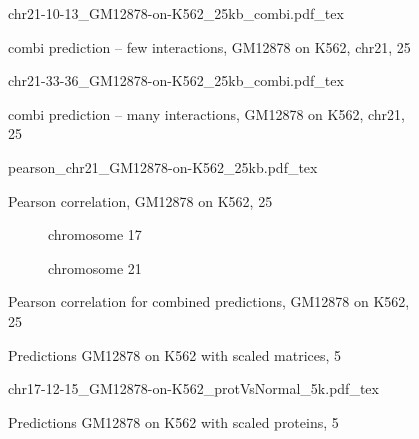 \begin{appendices}
\begin{figure}[hb]
 \centering
 \scriptsize
 {chr21-10-13_GM12878-on-K562_25kb_combi.pdf_tex}
 \caption{combi prediction -- few interactions, GM12878 on K562, chr21, \SI{25}{\kilo\bp}}
 \label{fig:app:GM12878:K562:chr21:25k:combiFew}
\end{figure}
\begin{figure}[hb]
 \centering
 \scriptsize
 {chr21-33-36_GM12878-on-K562_25kb_combi.pdf_tex}
 \caption{combi prediction -- many interactions, GM12878 on K562, chr21, \SI{25}{\kilo\bp}}
 \label{fig:app:GM12878:K562:chr21:25k:combiMany}
\end{figure}
\begin{figure}[hb]
 \centering
 \scriptsize
 {pearson_chr21_GM12878-on-K562_25kb.pdf_tex}
 \caption{Pearson correlation, GM12878 on K562, \SI{25}{\kilo\bp} }
 \label{fig:app:Pearson:GM12878:K562:chr21:25kb}
\end{figure}

\begin{figure}[hb]
 \centering
 \begin{subfigure}{0.495\textwidth}
 \centering
 \caption{chromosome 17}
 \label{fig:app:Pearson:GM12878:K562:chr17:25kb:combi}
\end{subfigure} \hfill
\begin{subfigure}{0.495\textwidth}
 \centering
 \caption{chromosome 21}
 \label{fig:app:Pearson:GM12878:K562:chr21:25kb:combi}
 \end{subfigure}
 \caption{Pearson correlation for combined predictions, GM12878 on K562, \SI{25}{\kilo\bp} }
\end{figure}

\begin{figure}[hb]
 \centering
 \caption{Predictions GM12878 on K562 with scaled matrices, \SI{5}{\kilo\bp}}
 \label{fig:app:GM12878:K562:chr17:normalizedMatrices}
\end{figure}
\begin{figure}[hb]
 \centering
 \scriptsize
 {chr17-12-15_GM12878-on-K562_protVsNormal_5k.pdf_tex}
 \caption{Predictions GM12878 on K562 with scaled proteins, \SI{5}{\kilo\bp}}
 \label{fig:app:GM12878:K562:chr17:normalizedProteins}
\end{figure}


\end{appendices}
